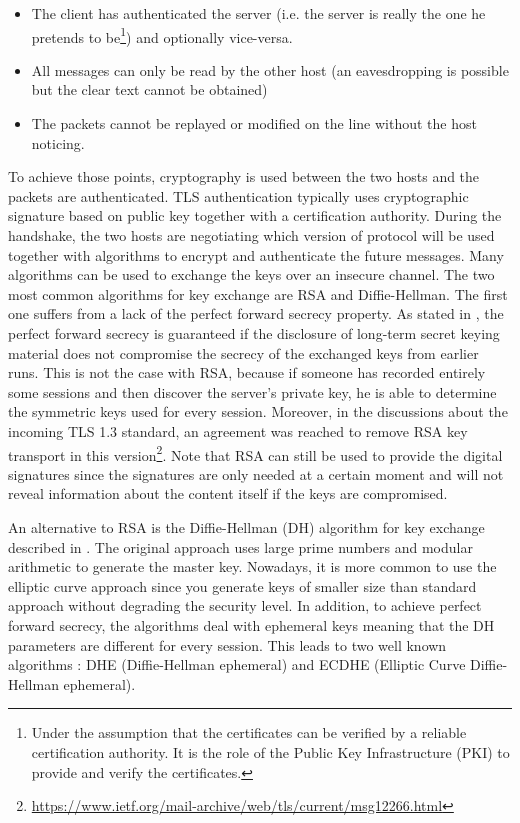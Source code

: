 \begin{itemize}
\item The client has authenticated the server (i.e. the server is really the one he pretends to be\footnote{Under the assumption that the certificates can be verified by a reliable certification authority. It is the role of the Public Key Infrastructure (PKI) to provide and verify the certificates.}) and optionally vice-versa.
\item All messages can only be read by the other host (an eavesdropping is possible but the clear text cannot be obtained)
\item The packets cannot be replayed or modified on the line without the host noticing.
\end{itemize}

To achieve those points, cryptography is used between the two hosts and the packets are authenticated. TLS authentication typically uses cryptographic signature based on public key together with a certification authority. During the handshake, the two hosts are negotiating which version of protocol will be used together with algorithms to encrypt and authenticate the future messages. Many algorithms can be used to exchange the keys over an insecure channel. The two most common algorithms for key exchange are RSA and Diffie-Hellman. The first one suffers from a lack of the perfect forward secrecy property. As stated in \cite{diffie1992authentication}, the perfect forward secrecy is guaranteed if the disclosure of long-term secret keying material does not compromise the secrecy of the exchanged keys from earlier runs. This is not the case with RSA, because if someone has recorded entirely some sessions and then discover the server's private key, he is able to determine the symmetric keys used for every session. Moreover, in the discussions about the incoming TLS 1.3 standard, an agreement was reached to remove RSA key transport in this version\footnote{\url{https://www.ietf.org/mail-archive/web/tls/current/msg12266.html}}. Note that RSA can still be used to provide the digital signatures since the signatures are only needed at a certain moment and will not reveal information about the content itself if the keys are compromised.

An alternative to RSA is the Diffie-Hellman (DH) algorithm for key exchange described in \cite{diffie1976new}. The original approach uses large prime numbers and modular arithmetic to generate the master key. Nowadays, it is more common to use the elliptic curve approach since you generate keys of smaller size than standard approach without degrading the security level. In addition, to achieve perfect forward secrecy, the algorithms deal with ephemeral keys meaning that the DH parameters are different for every session. This leads to two well known algorithms : DHE (Diffie-Hellman ephemeral) and ECDHE (Elliptic Curve Diffie-Hellman ephemeral).

